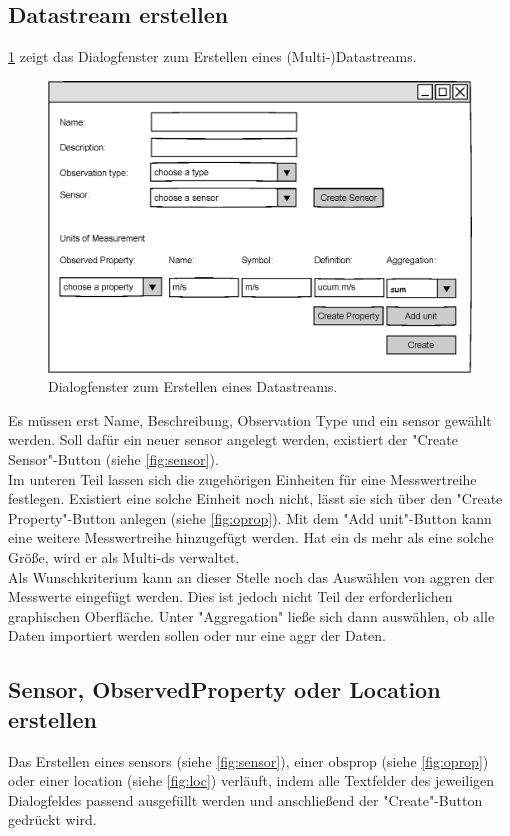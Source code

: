 \documentclass[a4paper, 12 pt]{article}
\begin{document}
\subsection{Datastream erstellen}
\cref{fig:ds} zeigt das Dialogfenster zum Erstellen eines (Multi-)Datastreams. 
\begin{figure}[htbp]
\centering
\includegraphics[scale=0.8]{images/datastream}
\caption{\label{fig:ds}Dialogfenster zum Erstellen eines Datastreams.}
\end{figure}
Es müssen erst Name, Beschreibung, Observation Type und ein \gls{sensor} gewählt werden. Soll dafür ein neuer \gls{sensor} angelegt werden, existiert der "{Create Sensor}"{-Button} (siehe \cref{fig:sensor}).\\

Im unteren Teil lassen sich die zugehörigen Einheiten für eine Messwertreihe festlegen. Existiert eine solche Einheit noch nicht, lässt sie sich über den "{Create Property}"{-Button} anlegen (siehe \cref{fig:oprop}). Mit dem "{Add unit}"{-Button} kann eine weitere Messwertreihe hinzugefügt werden. Hat ein \gls{ds} mehr als eine solche Größe, wird er als Multi-\gls{ds} verwaltet.\\

Als Wunschkriterium kann an dieser Stelle noch das Auswählen von \gls{aggr}en der Messwerte eingefügt werden. Dies ist jedoch nicht Teil der erforderlichen graphischen Oberfläche. Unter \string"Aggregation\string" ließe sich dann auswählen, ob alle Daten importiert werden sollen oder nur eine \gls{aggr} der Daten.


\pagebreak
\subsection{Sensor, ObservedProperty oder Location erstellen}
Das Erstellen eines \gls{sensor}s (siehe \cref{fig:sensor}), einer \gls{obsprop} (siehe \cref{fig:oprop}) oder einer \gls{location} (siehe \cref{fig:loc}) verläuft, indem alle Textfelder des jeweiligen Dialogfeldes passend ausgefüllt werden und anschließend der "{Create}"{-Button} gedrückt wird.
\end{document}
